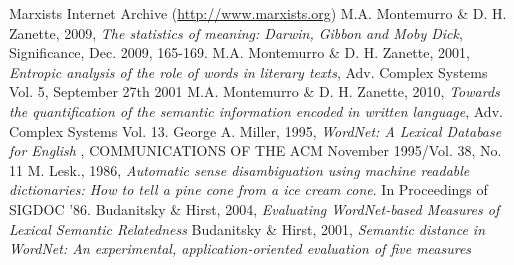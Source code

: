 \documentclass{pnastwo}
\begin{document}
\begin{article}

% 



\begin{thebibliography}{10}
Marxists Internet Archive (\url{http://www.marxists.org})
M.A. Montemurro \& D. H. Zanette, 2009, {\em The statistics of meaning: Darwin, Gibbon and Moby Dick}, Significance, Dec. 2009, 165-169.
M.A. Montemurro \& D. H. Zanette, 2001, {\em Entropic analysis of the role of words in literary texts}, Adv. Complex Systems Vol. 5, September 27th 2001
M.A. Montemurro \& D. H. Zanette, 2010, {\em Towards the quantification of the semantic information encoded in written language}, Adv. Complex Systems Vol. 13.
George A. Miller, 1995, {\em WordNet: A Lexical Database for English }, COMMUNICATIONS OF THE ACM November 1995/Vol. 38, No. 11
M. Lesk., 1986, {\em Automatic sense disambiguation using machine readable dictionaries: How to tell a pine cone from a ice cream cone}. In Proceedings of SIGDOC ’86.
Budanitsky \& Hirst, 2004, {\em Evaluating WordNet-based Measures of Lexical Semantic Relatedness}
Budanitsky \& Hirst, 2001, {\em Semantic distance in WordNet: An experimental, application-oriented evaluation of five measures}
\end{thebibliography}
\end{article}
\end{document}
